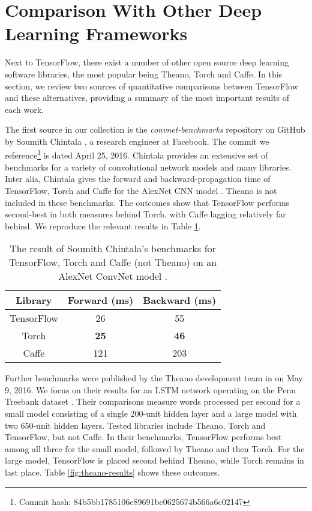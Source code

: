 \section{Comparison With Other Deep Learning Frameworks}\label{sec:comp}

Next to TensorFlow, there exist a number of other open source deep learning
software libraries, the most popular being Theano, Torch and Caffe. In this
section, we review two sources of quantitative comparisons between TensorFlow
and these alternatives, providing a summary of the most important results of
each work.

The first source in our collection is the \emph{convnet-benchmarks} repository
on GitHub by Soumith Chintala \cite{convnet-bench}, a research engineer at
Facebook. The commit we reference\footnote{Commit hash:
  84b5bb1785106e89691bc0625674b566a6c02147} is dated April 25, 2016. Chintala
provides an extensive set of benchmarks for a variety of convolutional network
models and many libraries. Inter alia, Chintala gives the forward and
backward-propagation time of TensorFlow, Torch and Caffe for the AlexNet CNN
model \cite{alexnet}. Theano is not included in these benchmarks. The outcomes
show that TensorFlow performs second-best in both measures behind Torch, with
Caffe lagging relatively far behind. We reproduce the relevant results in Table
\ref{tab:convnet}.

\begin{table}
  \centering
  \begin{tabular}{ccc}
    \textbf{Library} & \textbf{Forward (ms)} & \textbf{Backward (ms)}
    \\ \toprule
    TensorFlow & 26  & 55
    \\
    Torch & \textbf{25} & \textbf{46}
    \\
    Caffe & 121 & 203
    \\ \bottomrule
  \end{tabular}
  \caption{The result of Soumith Chintala's benchmarks for TensorFlow, Torch and
    Caffe (not Theano) on an AlexNet ConvNet model \cite{alexnet,
      convnet-bench}.}
  \label{tab:convnet}
\end{table}

Further benchmarks were published by the Theano development team in
\cite{theano} on May 9, 2016. We focus on their results for an LSTM network
operating on the Penn Treebank dataset \cite{penntreebank}. Their comparisons
measure words processed per second for a small model consisting of a single
200-unit hidden layer and a large model with two 650-unit hidden layers. Tested
libraries include Theano, Torch and TensorFlow, but not Caffe. In their
benchmarks, TensorFlow performs best among all three for the small model,
followed by Theano and then Torch. For the large model, TensorFlow is placed
second behind Theano, while Torch remains in last place. Table
\ref{fig:theano-results} shows these outcomes.

